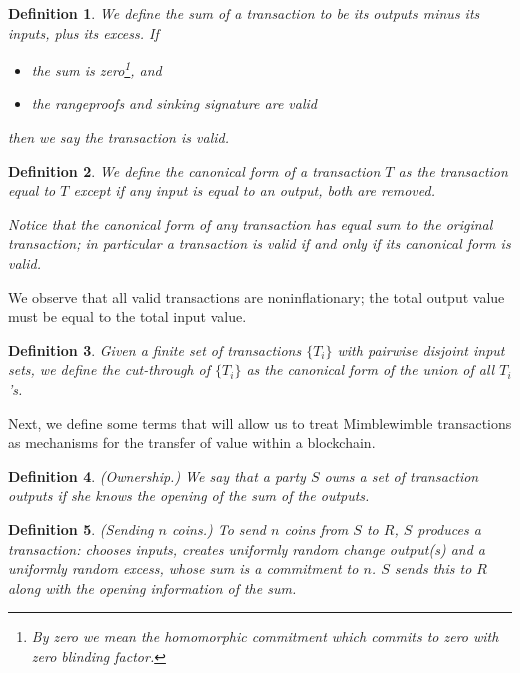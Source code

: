 \documentclass[letterpaper]{article}
\newtheorem{lmma}{Lemma}
\newtheorem{defn}{Definition}
\begin{document}
\begin{defn} We define the \emph{sum} of a transaction to be its
outputs minus its inputs, plus its excess. If
\begin{itemize}
\item the sum is zero\footnote{By zero we mean the homomorphic commitment which commits to zero with
zero blinding factor.}, and 
\item the rangeproofs and sinking signature are valid
\end{itemize}
then we say the transaction is \emph{valid}.
\end{defn}

\begin{defn} We define the \emph{canonical form} of a transaction
$T$ as the transaction equal to $T$ except if any input is equal
to an output, both are removed.

Notice that the canonical form of any transaction has equal sum
to the original transaction; in particular a transaction is valid
if and only if its canonical form is valid.\end{defn}

We observe that all valid transactions are noninflationary; the
total output value must be equal to the total input value.

\begin{defn} Given a finite set of transactions $\{T_i\}$ with
pairwise disjoint input sets, we define the \emph{cut-through}
of $\{T_i\}$ as the canonical form of the union of all $T_i$'s.
\end{defn}

Next, we define some terms that will allow us to treat Mimblewimble
transactions as mechanisms for the transfer of value within a blockchain.
\begin{defn} (Ownership.) We say that a party $S$ \emph{owns} a set
of transaction outputs if she knows the opening of the sum of the
outputs.\end{defn}

\begin{defn} (Sending $n$ coins.) To send $n$ coins from $S$
to $R$, $S$ produces a transaction: chooses inputs, creates uniformly
random change output(s) and a uniformly random excess, whose sum is
a commitment to $n$. $S$ sends this to $R$ along with the opening
information of the sum.
\label{send}
\end{defn}

\end{document}
